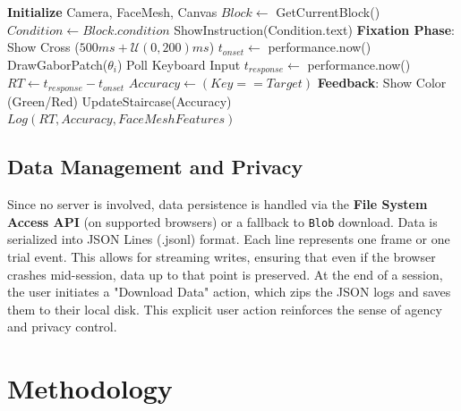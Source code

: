 \documentclass[final,3p,times,twocolumn]{elsarticle}
\begin{document}
\begin{algorithm}
\caption{Camerala Task Loop (Simplified)}
\begin{algorithmic}
\STATE \textbf{Initialize} Camera, FaceMesh, Canvas
    \STATE $Block \leftarrow$ GetCurrentBlock()
    \STATE $Condition \leftarrow Block.condition$
    \STATE ShowInstruction(Condition.text)
        \STATE \textbf{Fixation Phase}: Show Cross ($500ms + \mathcal{U}(0, 200)ms$)
        \STATE $t_{onset} \leftarrow$ performance.now()
        \STATE DrawGaborPatch($\theta_i$)
            \STATE Poll Keyboard Input
        \ENDWHILE
        \STATE $t_{response} \leftarrow$ performance.now()
        \STATE $RT \leftarrow t_{response} - t_{onset}$
        \STATE $Accuracy \leftarrow (Key == Target)$
        \STATE \textbf{Feedback}: Show Color (Green/Red)
        \STATE UpdateStaircase(Accuracy)
        \STATE $Log(RT, Accuracy, FaceMeshFeatures)$
    \ENDFOR
\ENDWHILE
\end{algorithmic}
\end{algorithm}

\subsection{Data Management and Privacy}
Since no server is involved, data persistence is handled via the \textbf{File System Access API} (on supported browsers) or a fallback to \texttt{Blob} download.
Data is serialized into JSON Lines (.jsonl) format. Each line represents one frame or one trial event. This allows for streaming writes,
ensuring that even if the browser crashes mid-session, data up to that point is preserved.
At the end of a session, the user initiates a "Download Data" action, which zips the JSON logs and saves them to their local disk.
This explicit user action reinforces the sense of agency and privacy control.

\section{Methodology}
\end{document}
